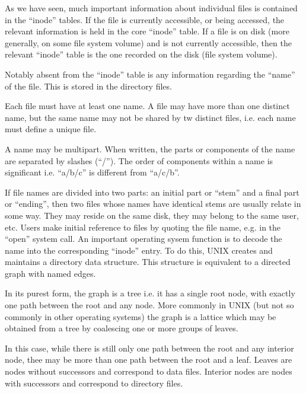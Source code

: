 %
%

As we have seen, much important  information  about
individual files is contained in the ``inode'' tables.   If  the
file  is currently accessible, or being
accessed, the relevant  information  is
held  in  the core ``inode'' table.  If a
file is on  disk  (more  generally,  on
some  file  system volume) and is not
currently accessible, then the relevant
``inode''  table  is  the one recorded on
the disk (file system volume).


Notably absent from the  ``inode''  table
is any information regarding the ``name''
of the file.  This  is  stored  in  the
directory files.


Each file must have at least one  name.
A file may have more than one  distinct
name, but the  same  name  may  not  be
shared  by  tw  distinct  files,  i.e.
each name must define a unique file.


A name may be multipart.  When written,
the parts or components of the name are
separated by slashes (``/'').  The  order
of components within a name is significant i.e. 
``a/b/c''  is  different  from ``a/c/b''.

If file  names  are  divided  into  two
parts:  an initial part or ``stem'' and a
final part or ``ending'', then two  files
whose  names  have  identical stems are
usually relate in some way.  They  may
reside  on  the  same  disk,  they  may
belong to the same user, etc.
Users make initial reference  to  files
by  quoting  the file name, e.g. in the
``open''  system  call.    An   important
operating  sysem function is to decode
the name into the corresponding ``inode''
entry.   To  do  this, UNIX creates and
maintains a directory  data  structure.
This   structure  is  equivalent  to  a
directed graph with named edges.


In its purest form, the graph is a tree
i.e.  it  has  a single root node, with
exactly one path between the  root  and
any  node.  More  commonly in UNIX (but
not so commonly in other operating systems) the graph is a lattice  which may
be obtained from a tree  by  coalescing
one or more groups of leaves.

In this case, while there is still only
one path between the root and any interior node, thee may be more  than  one
path  between  the  root  and  a  leaf.
Leaves are nodes without successors and
correspond to  data  files.  Interior
nodes are  nodes  with  successors  and
correspond to directory files.

